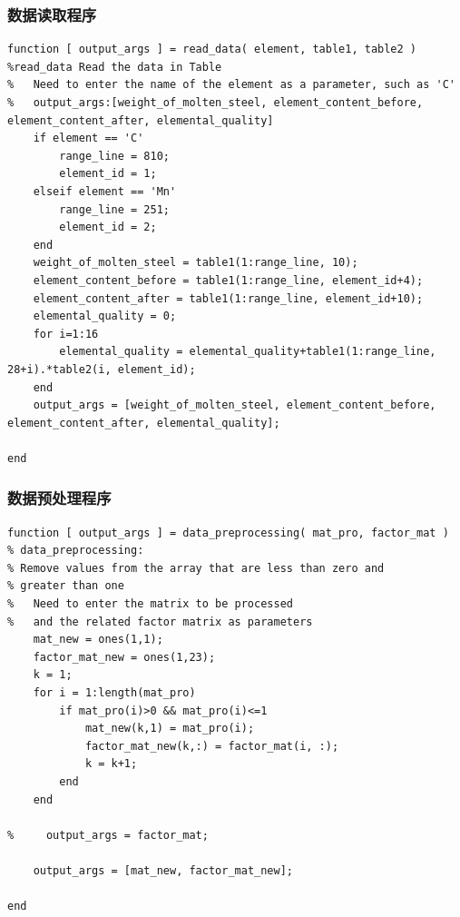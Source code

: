 \documentclass[12pt]{article}%
\begin{document}
\subsubsection{数据读取程序}
\begin{lstlisting}
function [ output_args ] = read_data( element, table1, table2 )
%read_data Read the data in Table
%   Need to enter the name of the element as a parameter, such as 'C'
%   output_args:[weight_of_molten_steel, element_content_before, element_content_after, elemental_quality]
    if element == 'C'
        range_line = 810;
        element_id = 1;
    elseif element == 'Mn'
        range_line = 251;
        element_id = 2;
    end
    weight_of_molten_steel = table1(1:range_line, 10);
    element_content_before = table1(1:range_line, element_id+4);
    element_content_after = table1(1:range_line, element_id+10);
    elemental_quality = 0;
    for i=1:16
        elemental_quality = elemental_quality+table1(1:range_line, 28+i).*table2(i, element_id);
    end
    output_args = [weight_of_molten_steel, element_content_before, element_content_after, elemental_quality];

end
\end{lstlisting}
\subsubsection{数据预处理程序}
\begin{lstlisting}
function [ output_args ] = data_preprocessing( mat_pro, factor_mat )
% data_preprocessing:
% Remove values from the array that are less than zero and
% greater than one
%   Need to enter the matrix to be processed
%   and the related factor matrix as parameters
    mat_new = ones(1,1);
    factor_mat_new = ones(1,23);
    k = 1;
    for i = 1:length(mat_pro)
        if mat_pro(i)>0 && mat_pro(i)<=1
            mat_new(k,1) = mat_pro(i);
            factor_mat_new(k,:) = factor_mat(i, :);
            k = k+1;
        end
    end

%     output_args = factor_mat;

    output_args = [mat_new, factor_mat_new];

end
\end{lstlisting}
\end{document}
